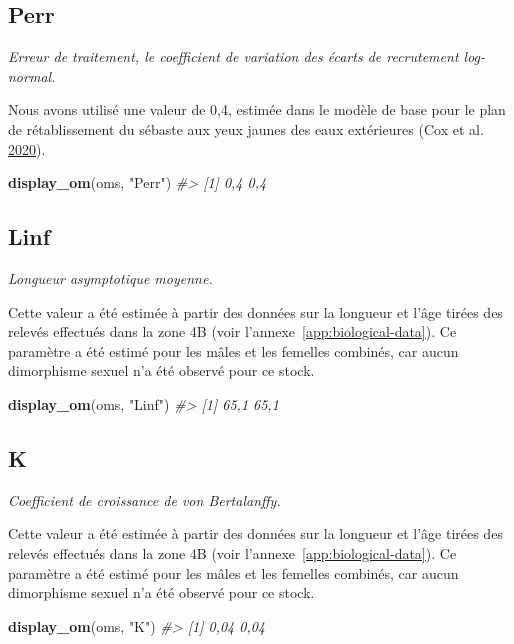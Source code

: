 \documentclass[french,11pt]{book}
\newenvironment{Shaded}{\begin{snugshade}}{\end{snugshade}}
\newcommand{\CommentTok}[1]{\textcolor[rgb]{0.56,0.35,0.01}{\textit{#1}}}
\newcommand{\KeywordTok}[1]{\textcolor[rgb]{0.13,0.29,0.53}{\textbf{#1}}}
\newcommand{\NormalTok}[1]{#1}
\newcommand{\StringTok}[1]{\textcolor[rgb]{0.31,0.60,0.02}{#1}}
\begin{document}
\subsection{Perr}
\label{app:desc-stock-perr-yelloweye}

\emph{Erreur de traitement, le coefficient de variation des écarts de recrutement log-normal.}

Nous avons utilisé une valeur de 0,4, estimée dans le modèle de base pour le plan de rétablissement du sébaste aux yeux jaunes des eaux extérieures (Cox et al. \protect\hyperlink{ref-cox2020}{2020}).
\begin{Shaded}
\begin{Highlighting}[]
\KeywordTok{display_om}\NormalTok{(oms, }\StringTok{"Perr"}\NormalTok{)}
\CommentTok{#> [1] 0,4 0,4}
\end{Highlighting}
\end{Shaded}
\subsection{Linf}
\label{app:desc-stock-linf-yelloweye}

\emph{Longueur asymptotique moyenne.}

Cette valeur a été estimée à partir des données sur la longueur et l'âge tirées des relevés effectués dans la zone 4B (voir l'annexe~\ref{app:biological-data}). Ce paramètre a été estimé pour les mâles et les femelles combinés, car aucun dimorphisme sexuel n'a été observé pour ce stock.
\begin{Shaded}
\begin{Highlighting}[]
\KeywordTok{display_om}\NormalTok{(oms, }\StringTok{"Linf"}\NormalTok{)}
\CommentTok{#> [1] 65,1 65,1}
\end{Highlighting}
\end{Shaded}
\subsection{K}
\label{app:desc-stock-k-yelloweye}

\emph{Coefficient de croissance de von Bertalanffy.}

Cette valeur a été estimée à partir des données sur la longueur et l'âge tirées des relevés effectués dans la zone 4B (voir l'annexe~\ref{app:biological-data}). Ce paramètre a été estimé pour les mâles et les femelles combinés, car aucun dimorphisme sexuel n'a été observé pour ce stock.
\begin{Shaded}
\begin{Highlighting}[]
\KeywordTok{display_om}\NormalTok{(oms, }\StringTok{"K"}\NormalTok{)}
\CommentTok{#> [1] 0,04 0,04}
\end{Highlighting}
\end{Shaded}
\end{document}
